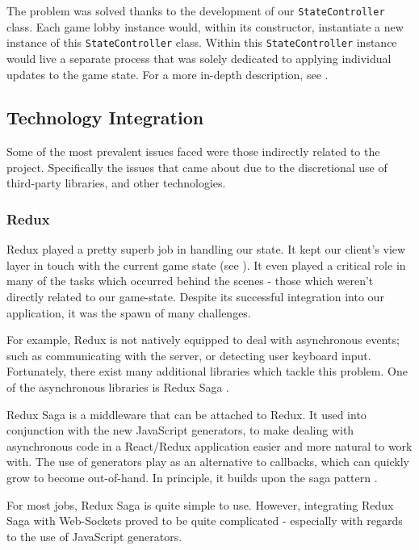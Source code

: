 \documentclass{standalone}
\begin{document}
			The problem was solved thanks to the development of our \texttt{StateController} class. Each game lobby instance would, within its constructor, instantiate a new instance of this \texttt{StateController} class. Within this \texttt{StateController} instance would live a separate process that was solely dedicated to applying individual updates to the game state. For a more in-depth description, see .

		\subsection{Technology Integration}
			Some of the most prevalent issues faced were those indirectly related to the project. Specifically the issues that came about due to the discretional use of third-party libraries, and other technologies.

			\subsubsection{Redux} \label{sec:reduxIntegration}
				Redux played a pretty superb job in handling our state. It kept our client's view layer in touch with the current game state (see ). It even played a critical role in many of the tasks which occurred behind the scenes - those which weren't directly related to our game-state. Despite its successful integration into our application, it was the spawn of many challenges.

				For example, Redux is not natively equipped to deal with asynchronous events; such as communicating with the server, or detecting user keyboard input. Fortunately, there exist many additional libraries which tackle this problem. One of the asynchronous libraries is Redux Saga \parencite{reduxSaga}.

				Redux Saga is a middleware that can be attached to Redux. It used into conjunction with the new JavaScript generators, to make dealing with asynchronous code in a React/Redux application easier and more natural to work with. The use of generators play as an alternative to callbacks, which can quickly grow to become out-of-hand. In principle, it builds upon the saga pattern \parencite{sagas}.

				For most jobs, Redux Saga is quite simple to use. However, integrating Redux Saga with Web-Sockets proved to be quite complicated - especially with regards to the use of JavaScript generators.
\end{document}
